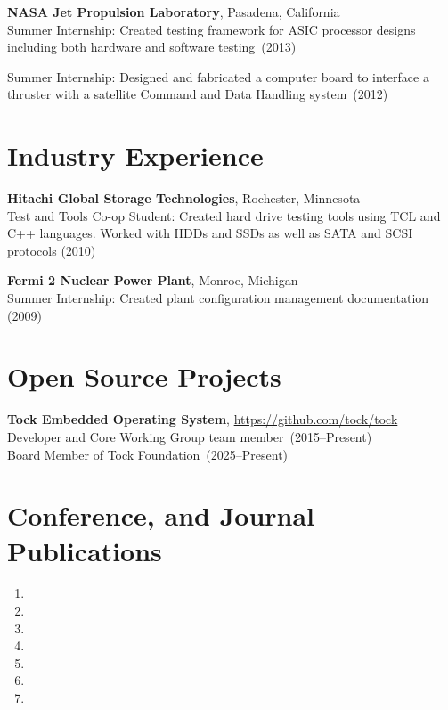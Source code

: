 \documentclass{article}
\begin{document}
{\bf NASA Jet Propulsion Laboratory}, Pasadena, California \\
Summer Internship: Created testing framework for ASIC processor designs
including both hardware and software testing~(2013)

Summer Internship: Designed and fabricated a computer board to interface a
thruster with a satellite Command and Data Handling system~(2012)



\section*{Industry Experience}
\vspace{-6pt}

{\bf Hitachi Global Storage Technologies}, Rochester, Minnesota \\
Test and Tools Co-op Student: Created hard drive testing tools using TCL and
C++ languages. Worked with HDDs and SSDs as well as SATA and SCSI protocols (2010)

{\bf Fermi 2 Nuclear Power Plant}, Monroe, Michigan \\
Summer Internship: Created plant configuration management documentation (2009)

\section*{Open Source Projects}
\vspace{-6pt}

{\bf Tock Embedded Operating System}, \url{https://github.com/tock/tock} \\
Developer and Core Working Group team member~(2015--Present) \\
Board Member of Tock Foundation~(2025--Present)


\section*{Conference, and Journal Publications}
\vspace{-6pt}
\begin{enumerate}
  \item {}
  \item {}
  \item {}
  \item {}
  \item {}
  \item {}
  \item {}
\end{enumerate}
\end{document}
